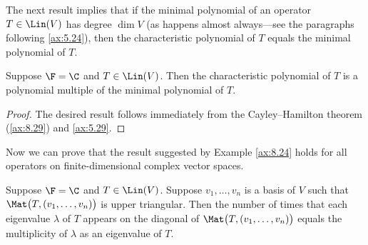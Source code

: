 The next result implies that if the minimal polynomial of an operator
$T\in\Lin(V)$ has degree $\dim V$ (as happens almost always---see the
paragraphs following \ref{ax:5.24}), then the characteristic polynomial of $T$
equals the minimal polynomial of $T$.

\begin{result}\label{ax:8.30}
Suppose $\F=\C$ and $T\in\Lin(V)$. Then the characteristic polynomial of $T$ is
a polynomial multiple of the minimal polynomial of $T$.
\end{result}

\begin{proof}
The desired result follows immediately from the Cayley--Hamilton theorem
(\ref{ax:8.29}) and \ref{ax:5.29}.
\end{proof}

Now we can prove that the result suggested by Example \ref{ax:8.24} holds for
all operators on finite-dimensional complex vector spaces.

\begin{result}\label{ax:8.31}
Suppose $\F=\C$ and $T\in\Lin(V)$. Suppose $v_1,\dots,v_n$ is a basis of $V$
such that $\Mat\bigl(T,(v_1,\dots,v_n)\bigr)$ is upper triangular. Then the
number of times that each eigenvalue $\lambda$ of $T$ appears on the diagonal of
$\Mat\bigl(T,(v_1,\dots,v_n)\bigr)$ equals the multiplicity of $\lambda$ as an
eigenvalue of $T$.
\end{result}

